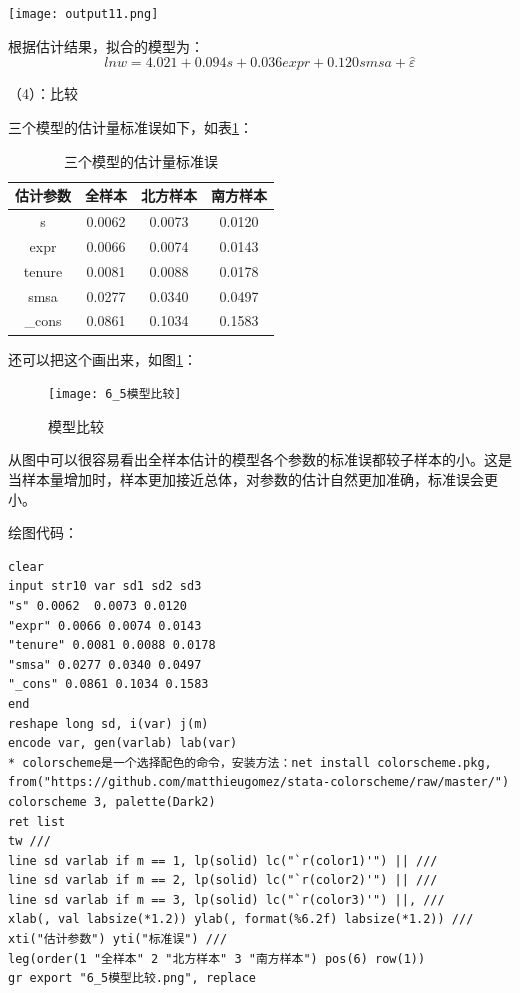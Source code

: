 \documentclass[cn,fancy,blue,11pt]{elegantbook}
\begin{document}
\noindent\texttt{[image: output11.png]}

根据估计结果，拟合的模型为：
\begin{equation}
  lnw = 4.021 + 0.094s + 0.036expr + 0.120smsa +\hat{\varepsilon}
\end{equation}

（4）：比较

三个模型的估计量标准误如下，如表\ref{tab:table1}：

\begin{table}[htbp]
  \centering
  \caption{三个模型的估计量标准误}
  \label{tab:table1}
  \begin{tabular}{cccc}
    \toprule
    估计参数 & 全样本 & 北方样本 & 南方样本\tabularnewline
    \midrule
    s & 0.0062 & 0.0073 & 0.0120\tabularnewline
    expr & 0.0066 & 0.0074 & 0.0143\tabularnewline
    tenure & 0.0081 & 0.0088 & 0.0178\tabularnewline
    smsa & 0.0277 & 0.0340 & 0.0497\tabularnewline
    \_cons & 0.0861 & 0.1034 & 0.1583\tabularnewline
    \bottomrule
  \end{tabular}
\end{table}

还可以把这个画出来，如图\ref{fig:pic65}：

\begin{figure}
  \centering
  \texttt{[image: 6\_5模型比较]}
  \caption{模型比较}
  \label{fig:pic65}
\end{figure}

从图中可以很容易看出全样本估计的模型各个参数的标准误都较子样本的小。这是当样本量增加时，样本更加接近总体，对参数的估计自然更加准确，标准误会更小。

绘图代码：

\begin{lstlisting}
clear
input str10 var sd1 sd2 sd3
"s" 0.0062  0.0073 0.0120
"expr" 0.0066 0.0074 0.0143
"tenure" 0.0081 0.0088 0.0178
"smsa" 0.0277 0.0340 0.0497
"_cons" 0.0861 0.1034 0.1583
end
reshape long sd, i(var) j(m)
encode var, gen(varlab) lab(var)
* colorscheme是一个选择配色的命令，安装方法：net install colorscheme.pkg, from("https://github.com/matthieugomez/stata-colorscheme/raw/master/")
colorscheme 3, palette(Dark2)
ret list
tw ///
line sd varlab if m == 1, lp(solid) lc("`r(color1)'") || ///
line sd varlab if m == 2, lp(solid) lc("`r(color2)'") || ///
line sd varlab if m == 3, lp(solid) lc("`r(color3)'") ||, ///
xlab(, val labsize(*1.2)) ylab(, format(%6.2f) labsize(*1.2)) ///
xti("估计参数") yti("标准误") ///
leg(order(1 "全样本" 2 "北方样本" 3 "南方样本") pos(6) row(1))
gr export "6_5模型比较.png", replace
\end{lstlisting}
\end{document}
